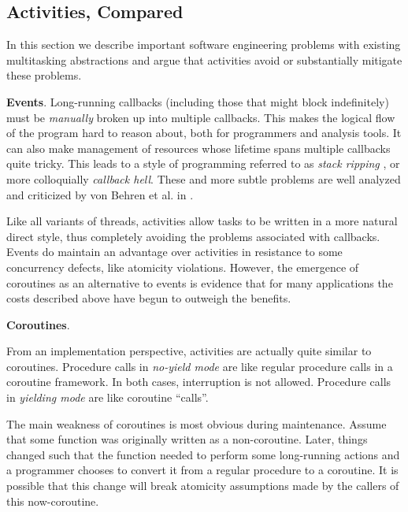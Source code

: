 \documentclass[9pt,preprint]{sigplanconf-2}
\begin{document}
\subsection{Activities, Compared}

In this section we describe important software engineering problems with existing multitasking abstractions and argue that activities avoid or substantially mitigate these problems.

\textbf{Events}.
Long-running callbacks (including those that might block indefinitely) must be \emph{manually} broken up into multiple callbacks.
This makes the logical flow of the program hard to reason about, both for programmers and analysis tools.
It can also make management of resources whose lifetime spans multiple callbacks quite tricky.
This leads to a style of programming referred to as \emph{stack ripping} \cite{Adya2002}, or more colloquially \emph{callback hell}.
These and more subtle problems are well analyzed and criticized by von Behren et al. in \cite{Behren2003a}.


Like all variants of threads, activities allow tasks to be written in a more natural direct style, thus completely avoiding the problems associated with callbacks.
Events do maintain an advantage over activities in resistance to some concurrency defects, like atomicity violations.
However, the emergence of coroutines as an alternative to events is evidence that for many applications the costs described above have begun to outweigh the benefits.

\textbf{Coroutines}.


From an implementation perspective, activities are actually quite similar to coroutines.
Procedure calls in \emph{no-yield mode} are like regular procedure calls in a coroutine framework.
In both cases, interruption is not allowed.
Procedure calls in \emph{yielding mode} are like coroutine ``calls''.

The main weakness of coroutines is most obvious during maintenance.
Assume that some function was originally written as a non-coroutine.
Later, things changed such that the function needed to perform some long-running actions and a programmer chooses to convert it from a regular procedure to a coroutine.
It is possible that this change will break atomicity assumptions made by the callers of this now-coroutine.
\end{document}
